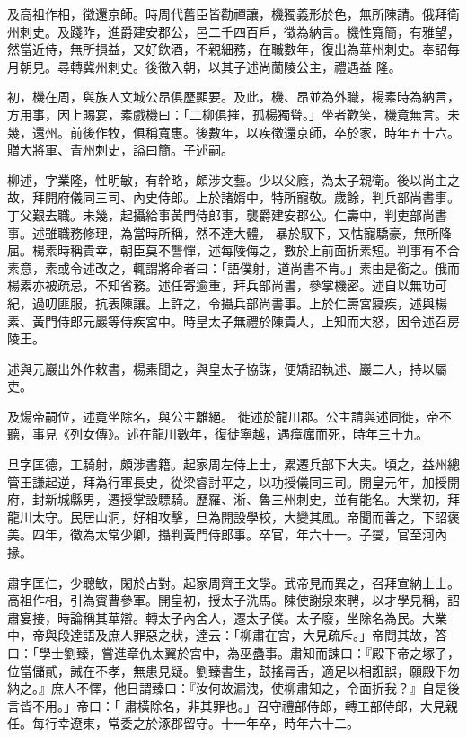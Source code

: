 \begin{pinyinscope}
 及高祖作相，徵還京師。時周代舊臣皆勸禪讓，機獨義形於色，無所陳請。俄拜衛州刺史。及踐阼，進爵建安郡公，邑二千四百戶，徵為納言。機性寬簡，有雅望，然當近侍，無所損益，又好飲酒，不親細務，在職數年，復出為華州刺史。奉詔每月朝見。尋轉冀州刺史。後徵入朝，以其子述尚蘭陵公主，禮遇益
 隆。



 初，機在周，與族人文城公昂俱歷顯要。及此，機、昂並為外職，楊素時為納言，方用事，因上賜宴，素戲機曰：「二柳俱摧，孤楊獨聳。」坐者歡笑，機竟無言。未幾，還州。前後作牧，俱稱寬惠。後數年，以疾徵還京師，卒於家，時年五十六。贈大將軍、青州刺史，謚曰簡。子述嗣。



 柳述，字業隆，性明敏，有幹略，頗涉文藝。少以父廕，為太子親衛。後以尚主之故，拜開府儀同三司、內史侍郎。上於諸婿中，特所寵敬。歲餘，判兵部尚書事。丁父艱去職。未幾，起攝給事黃門侍郎事，襲爵建安郡公。仁壽中，判吏部尚書事。述雖職務修理，為當時所稱，然不達大體，
 暴於馭下，又怙寵驕豪，無所降屈。楊素時稱貴幸，朝臣莫不讋憚，述每陵侮之，數於上前面折素短。判事有不合素意，素或令述改之，輒謂將命者曰：「語僕射，道尚書不肯。」素由是銜之。俄而楊素亦被疏忌，不知省務。述任寄逾重，拜兵部尚書，參掌機密。述自以無功可紀，過叨匪服，抗表陳讓。上許之，令攝兵部尚書事。上於仁壽宮寢疾，述與楊素、黃門侍郎元巖等侍疾宮中。時皇太子無禮於陳貴人，上知而大怒，因令述召房陵王。



 述與元巖出外作敕書，楊素聞之，與皇太子協謀，便矯詔執述、巖二人，持以屬吏。



 及煬帝嗣位，述竟坐除名，與公主離絕。
 徙述於龍川郡。公主請與述同徙，帝不聽，事見《列女傳》。述在龍川數年，復徙寧越，遇瘴癘而死，時年三十九。



 旦字匡德，工騎射，頗涉書籍。起家周左侍上士，累遷兵部下大夫。頃之，益州總管王謙起逆，拜為行軍長史，從梁睿討平之，以功授儀同三司。開皇元年，加授開府，封新城縣男，遷授掌設驃騎。歷羅、淅、魯三州刺史，並有能名。大業初，拜龍川太守。民居山洞，好相攻擊，旦為開設學校，大變其風。帝聞而善之，下詔褒美。四年，徵為太常少卿，攝判黃門侍郎事。卒官，年六十一。子燮，官至河內掾。



 肅字匡仁，少聰敏，閑於占對。起家周齊王文學。武帝見而異之，召拜宣納上士。高祖作相，引為賓曹參軍。開皇初，授太子洗馬。陳使謝泉來聘，以才學見稱，詔肅宴接，時論稱其華辯。轉太子內舍人，遷太子僕。太子廢，坐除名為民。大業中，帝與段達語及庶人罪惡之狀，達云：「柳肅在宮，大見疏斥。」帝問其故，答曰：「學士劉臻，嘗進章仇太翼於宮中，為巫蠱事。肅知而諫曰：『殿下帝之塚子，位當儲貳，誡在不孝，無患見疑。劉臻書生，鼓搖脣舌，適足以相誑誤，願殿下勿納之。』庶人不懌，他日謂臻曰：『汝何故漏洩，使柳肅知之，令面折我？』自是後言皆不用。」帝曰：「
 肅橫除名，非其罪也。」召守禮部侍郎，轉工部侍郎，大見親任。每行幸遼東，常委之於涿郡留守。十一年卒，時年六十二。




\end{pinyinscope}
